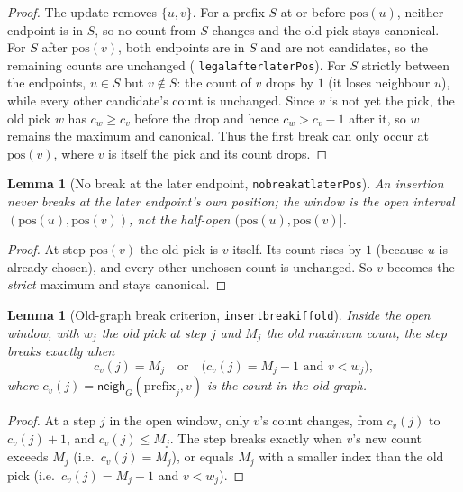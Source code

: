 \documentclass[11pt]{article}
\newtheorem{lemma}[theorem]{Lemma}
\theoremstyle{definition}
\theoremstyle{remark}
\newcommand{\leanname}[1]{%
  \texttt{\begingroup\def\_{\textunderscore\allowbreak}#1\endgroup}}
\newcommand{\neigh}{\mathsf{neigh}}
\begin{document}
\begin{proof}
The update removes $\{u,v\}$. For a prefix $S$ at or before $\mathrm{pos}(u)$,
neither endpoint is in $S$, so no count from $S$ changes and the old pick stays
canonical. For $S$ after $\mathrm{pos}(v)$, both endpoints are in $S$ and are
not candidates, so the remaining counts are unchanged
(\leanname{legal\_after\_laterPos}). For $S$ strictly between the endpoints,
$u\in S$ but $v\notin S$: the count of $v$ drops by $1$ (it loses neighbour $u$),
while every other candidate's count is unchanged. Since $v$ is not yet the pick,
the old pick $w$ has $c_w\ge c_v$ before the drop and hence $c_w>c_v-1$ after it,
so $w$ remains the maximum and canonical. Thus the first break can only occur at
$\mathrm{pos}(v)$, where $v$ is itself the pick and its count drops.
\end{proof}

\begin{lemma}[No break at the later endpoint, \leanname{no\_break\_at\_laterPos}]
\label{lem:no-break-later}
An insertion never breaks at the later endpoint's own position; the window is
the open interval $(\mathrm{pos}(u),\mathrm{pos}(v))$, not the half-open
$(\mathrm{pos}(u),\mathrm{pos}(v)]$.
\end{lemma}

\begin{proof}
At step $\mathrm{pos}(v)$ the old pick is $v$ itself. Its count rises by $1$
(because $u$ is already chosen), and every other unchosen count is unchanged. So
$v$ becomes the \emph{strict} maximum and stays canonical.
\end{proof}

\begin{lemma}[Old-graph break criterion, \leanname{insert\_break\_iff\_old}]
\label{lem:old-break}
Inside the open window, with $w_j$ the old pick at step $j$ and $M_j$ the old
maximum count, the step breaks exactly when
\[
c_v(j)=M_j \quad\text{or}\quad \bigl(c_v(j)=M_j-1 \text{ and } v<w_j\bigr),
\]
where $c_v(j)=\neigh_G(\mathrm{prefix}_j, v)$ is the count in the \emph{old}
graph.
\end{lemma}

\begin{proof}
At a step $j$ in the open window, only $v$'s count changes, from $c_v(j)$ to
$c_v(j)+1$, and $c_v(j)\le M_j$. The step breaks exactly when $v$'s new count
exceeds $M_j$ (i.e.\ $c_v(j)=M_j$), or equals $M_j$ with a smaller index than the
old pick (i.e.\ $c_v(j)=M_j-1$ and $v<w_j$).
\end{proof}
\end{document}
